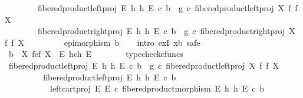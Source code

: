 \begin{isabellebody}
\ \ \ \ \ \ \ \ fibered{\isacharunderscore}{\kern0pt}product{\isacharunderscore}{\kern0pt}left{\isacharunderscore}{\kern0pt}proj\ E\ h\ h\ E\ {\isasymcirc}\isactrlsub c\ b\ {\isacharequal}{\kern0pt}\ g\ {\isasymcirc}\isactrlsub c\ fibered{\isacharunderscore}{\kern0pt}product{\isacharunderscore}{\kern0pt}left{\isacharunderscore}{\kern0pt}proj\ X\ f\ f\ X\ {\isasymand}\isanewline
\ \ \ \ \ \ \ \ fibered{\isacharunderscore}{\kern0pt}product{\isacharunderscore}{\kern0pt}right{\isacharunderscore}{\kern0pt}proj\ E\ h\ h\ E\ {\isasymcirc}\isactrlsub c\ b\ {\isacharequal}{\kern0pt}\ g\ {\isasymcirc}\isactrlsub c\ fibered{\isacharunderscore}{\kern0pt}product{\isacharunderscore}{\kern0pt}right{\isacharunderscore}{\kern0pt}proj\ X\ f\ f\ X\ {\isasymand}\isanewline
\ \ \ \ \ \ \ \ epimorphism\ b{\isachardoublequoteclose}\isanewline
\ \ \isamarkupfalse%
\ {\isacharparenleft}{\kern0pt}intro\ exI{\isacharbrackleft}{\kern0pt}\ x{\isacharequal}{\kern0pt}b{\isacharbrackright}{\kern0pt}{\isacharcomma}{\kern0pt}\ safe{\isacharparenright}{\kern0pt}\isanewline
\ \ \ \ \isamarkupfalse%
\ {\isachardoublequoteopen}b\ {\isacharcolon}{\kern0pt}\ X\ \isactrlbsub f\isactrlesub {\isasymtimes}\isactrlsub c\isactrlbsub f\isactrlesub \ X\ {\isasymrightarrow}\ E\ \isactrlbsub h\isactrlesub {\isasymtimes}\isactrlsub c\isactrlbsub h\isactrlesub \ E{\isachardoublequoteclose}\isanewline
\ \ \ \ \ \ \isamarkupfalse%
\ typecheck{\isacharunderscore}{\kern0pt}cfuncs\isanewline
\ \ \ \ \isamarkupfalse%
\ {\isachardoublequoteopen}fibered{\isacharunderscore}{\kern0pt}product{\isacharunderscore}{\kern0pt}left{\isacharunderscore}{\kern0pt}proj\ E\ h\ h\ E\ {\isasymcirc}\isactrlsub c\ b\ {\isacharequal}{\kern0pt}\ g\ {\isasymcirc}\isactrlsub c\ fibered{\isacharunderscore}{\kern0pt}product{\isacharunderscore}{\kern0pt}left{\isacharunderscore}{\kern0pt}proj\ X\ f\ f\ X{\isachardoublequoteclose}\isanewline
\ \ \ \ \isamarkupfalse%
\ {\isacharminus}{\kern0pt}\isanewline
\ \ \ \ \ \ \isamarkupfalse%
\ {\isachardoublequoteopen}fibered{\isacharunderscore}{\kern0pt}product{\isacharunderscore}{\kern0pt}left{\isacharunderscore}{\kern0pt}proj\ E\ h\ h\ E\ {\isasymcirc}\isactrlsub c\ b\isanewline
\ \ \ \ \ \ \ \ \ \ {\isacharequal}{\kern0pt}\ left{\isacharunderscore}{\kern0pt}cart{\isacharunderscore}{\kern0pt}proj\ E\ E\ {\isasymcirc}\isactrlsub c\ fibered{\isacharunderscore}{\kern0pt}product{\isacharunderscore}{\kern0pt}morphism\ E\ h\ h\ E\ {\isasymcirc}\isactrlsub c\ b{\isachardoublequoteclose}\isanewline

\end{isabellebody}
